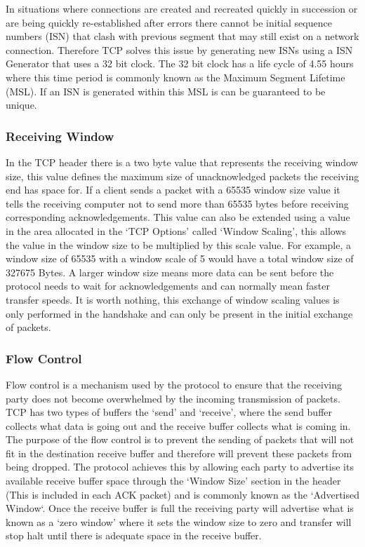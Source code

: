 In situations where connections are created and recreated quickly in succession or are being quickly re-established after errors there cannot be initial sequence numbers (ISN) that clash with previous segment that may still exist on a network connection. Therefore TCP solves this issue by generating new ISNs using a ISN Generator that uses a 32 bit clock. The 32 bit clock has a life cycle of 4.55 hours where this time period is commonly known as the Maximum Segment Lifetime (MSL). If an ISN is generated within this MSL is can be guaranteed to be unique.

\subsubsection*{Receiving Window}
In the TCP header there is a two byte value that represents the receiving window size, this value defines the maximum size of unacknowledged packets the receiving end has space for. If a client sends a packet with a 65535 window size value it tells the receiving computer not to send more than 65535 bytes before receiving corresponding acknowledgements. This value can also be extended using a value in the area allocated in the `TCP Options' called `Window Scaling', this allows the value in the window size to be multiplied by this scale value. For example, a window size of 65535 with a window scale of 5 would have a total window size of 327675 Bytes. A larger window size means more data can be sent before the protocol needs to wait for acknowledgements and can normally mean faster transfer speeds. It is worth nothing, this exchange of window scaling values is only performed in the handshake and can only be present in the initial exchange of packets.

\subsubsection*{Flow Control}
Flow control is a mechanism used by the protocol to ensure that the receiving party does not become overwhelmed by the incoming transmission of packets. TCP has two types of buffers the `send' and `receive', where the send buffer collects what data is going out and the receive buffer collects what is coming in. The purpose of the flow control is to prevent the sending of packets that will not fit in the destination receive buffer and therefore will prevent these packets from being dropped. The protocol achieves this by allowing each party to advertise its available receive buffer space through the `Window Size' section in the header (This is included in each ACK packet) and is commonly known as the `Advertised Window`. Once the receive buffer is full the receiving party will advertise what is known as a `zero window' where it sets the window size to zero and transfer will stop halt until there is adequate space in the receive buffer.

